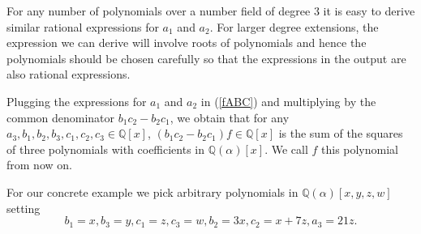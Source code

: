 \documentclass{amsart}
\theoremstyle{definition}
\theoremstyle{remark}
\numberwithin{equation}{section}
\newcommand{\Q}{{\mathbb Q}}
\begin{document}

For any number of polynomials over a number field of degree $3$ it is easy to derive similar rational expressions for $a_1$ and $a_2$. For larger degree extensions, the expression we can derive will involve roots of polynomials and hence the polynomials should be chosen carefully so that the expressions in the output are also rational expressions.

Plugging the expressions for $a_1$ and $a_2$ in (\ref{fABC}) and multiplying by the common denominator $b_1 c_2-b_2 c_1$, we obtain that for any $a_3, b_1, b_2, b_3, c_1, c_2, c_3 \in \Q[x]$, $(b_1 c_2-b_2 c_1)f \in \Q[x]$ is the sum of the squares of three polynomials with coefficients in $\Q(\alpha)[x]$. We call $f$ this polynomial from now on.

For our concrete example we pick arbitrary polynomials in $\Q(\alpha)[x,y,z,w]$ setting
\begin{equation}
\label{equation:subst}
b_1 = x, b_3=y, c_1=z, c_3=w, b_2 = 3x, c_2 = x+7z, a_3 = 21z.
\end{equation}
\end{document}
